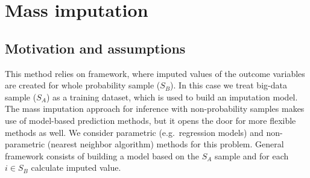 \documentclass[
  letterpaper,
  DIV=11,
  numbers=noendperiod]{scrreprt}
\begin{document}
\[
\newcommand{\bSigma}{\boldsymbol{\Sigma}}
\newcommand{\bOmega}{\boldsymbol{\Omega}}
\newcommand{\bTheta}{\boldsymbol{\Theta}}
\newcommand{\bPi}{\boldsymbol{\Pi}}
\newcommand{\bbeta}{\boldsymbol{\beta}}
\newcommand{\balpha}{\boldsymbol{\alpha}}
\newcommand{\brho}{\boldsymbol{\rho}}
\newcommand{\beps}{\boldsymbol{\epsilon}}
\newcommand{\blambda}{\boldsymbol{\lambda}}
\newcommand{\bgamma}{\boldsymbol{\gamma}}
\newcommand{\btheta}{\boldsymbol{\theta}}
\newcommand{\bmu}{\boldsymbol{\mu}}
\newcommand{\bpi}{\boldsymbol{\pi}}
\newcommand{\bphi}{\boldsymbol{\phi}}
\newcommand{\bPhi}{\boldsymbol{\Phi}}
\newcommand{\boldeta}{\boldsymbol{\eta}}
\newcommand{\bx}{\boldsymbol{x}}
\newcommand{\bD}{\boldsymbol{D}}
\newcommand{\bV}{\boldsymbol{V}}
\newcommand{\bv}{\boldsymbol{v}}
\newcommand{\bY}{\boldsymbol{Y}}
\newcommand{\bA}{\boldsymbol{A}}
\newcommand{\bB}{\boldsymbol{B}}
\newcommand{\bR}{\boldsymbol{R}}
\newcommand{\bM}{\boldsymbol{M}}
\newcommand{\bI}{\boldsymbol{I}}
\newcommand{\bC}{\boldsymbol{C}}
\newcommand{\bW}{\boldsymbol{W}}
\newcommand{\bw}{\boldsymbol{w}}
\newcommand{\bd}{\boldsymbol{d}}
\newcommand{\bT}{\boldsymbol{T}}
\newcommand{\bt}{\boldsymbol{t}}
\newcommand{\bZ}{\boldsymbol{Z}}
\newcommand{\bX}{\boldsymbol{X}}
\newcommand{\bz}{\boldsymbol{z}}
\newcommand{\by}{\boldsymbol{y}}
\newcommand{\br}{\boldsymbol{r}}
\newcommand{\bp}{\boldsymbol{p}}
\newcommand{\bb}{\boldsymbol{b}}
\newcommand{\bZero}{\boldsymbol{0}}
\newcommand{\bOne}{\boldsymbol{1}}
\]


\chapter{Mass imputation}\label{mass-imputation}

\section{Motivation and assumptions}\label{motivation-and-assumptions-1}

This method relies on framework, where imputed values of the outcome
variables are created for whole probability sample (\(S_B\)). In this
case we treat big-data sample (\(S_A\)) as a training dataset, which is
used to build an imputation model. The mass imputation approach for
inference with non-probability samples makes use of model-based
prediction methods, but it opens the door for more flexible methods as
well. We consider parametric (e.g.~regression models) and non-parametric
(nearest neighbor algorithm) methods for this problem. General framework
consists of building a model based on the \(S_A\) sample and for each
\(i \in S_B\) calculate imputed value.
\end{document}
